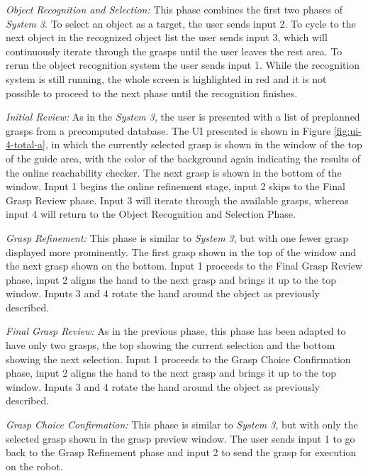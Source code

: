 \emph{Object Recognition and Selection:} This phase combines the first two phases of \emph{System 3}. To select an object as a target, the user sends input 2. To cycle to the next object in the recognized object list the user sends input 3, which will continuously iterate through the grasps until the user leaves the rest area. To rerun the object recognition system the user sends input 1. While the recognition system is still running, the whole screen is highlighted in red and it is not possible to proceed to the next phase until the recognition finishes. 

\emph{Initial Review:} As in the \emph{System 3}, the user is presented with a list of preplanned grasps from a precomputed database. The UI presented is shown in Figure \ref{fig:ui-4-total-a}, in which the currently selected grasp is shown in the window of the top of the guide area, with the color of the background again indicating the results of the online reachability checker. The next grasp is shown in the bottom of the window. Input 1 begins the online refinement stage, input 2 skips to the Final Grasp Review phase. Input 3 will iterate through the available grasps, whereas input 4 will return to the Object Recognition and Selection Phase.

\emph{Grasp Refinement:} This phase is similar to \emph{System 3}, but with one fewer grasp displayed more prominently. The first grasp shown in the top of the window and the next grasp shown on the bottom. Input 1 proceeds to the Final Grasp Review phase, input 2 aligns the hand to the next grasp and brings it up to the top window. Inputs 3 and 4 rotate the hand around the object as previously described. 

\emph{Final Grasp Review:} As in the previous phase, this phase has been adapted to have only two grasps, the top showing the current selection and the bottom showing the next selection. Input 1 proceeds to the Grasp Choice Confirmation phase, input 2 aligns the hand to the next grasp and brings it up to the top window. Inputs 3 and 4 rotate the hand around the object as previously described. 

\emph{Grasp Choice Confirmation:} This phase is similar to \emph{System 3}, but with only the selected grasp shown in the grasp preview window. The user sends input 1 to go back to the Grasp Refinement phase and input 2 to send the grasp for execution on the robot.

